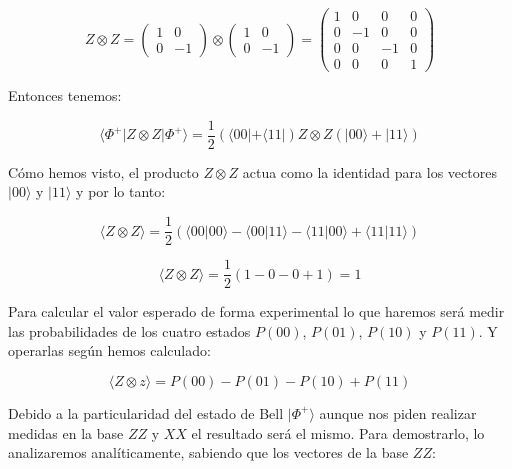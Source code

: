 \documentclass[11pt, a4paper, twocolumn]{article}
\begin{document}
\begin{equation}
	Z \otimes Z = 
	\begin{pmatrix}
		1 & 0\\ 0 & -1
	\end{pmatrix} \otimes
	\begin{pmatrix}
		1 & 0\\ 0 & -1
	\end{pmatrix}
	=
	\begin{pmatrix}
		1 & 0 & 0 & 0 \\
		0 &-1 & 0 & 0 \\
		0 & 0 &-1 & 0 \\
		0 & 0 & 0 & 1

	\end{pmatrix}	
\end{equation}

Entonces tenemos:

\begin{equation}
	\langle \Phi^+| Z \otimes Z |\Phi^+ \rangle = 
	\frac{1}{2}(\langle 00 | + \langle 11|) Z \otimes Z (|00\rangle + |11\rangle)
\end{equation}

Cómo hemos visto, el producto $Z \otimes Z$ actua como la identidad para los 
vectores $|00\rangle$ y $|11\rangle$ y por lo tanto:

\begin{equation}
	\langle Z \otimes Z \rangle = \frac{1}{2}(\langle 00 | 00 \rangle - 
	\langle 00 | 11 \rangle - \langle 11 | 00 \rangle + \langle 11 | 11 \rangle)
\end{equation}

\begin{equation}
	\langle Z \otimes Z \rangle = \frac{1}{2}(1 - 0 -0 +1) = 1
\end{equation}

Para calcular el valor esperado de forma experimental lo que haremos será medir
las probabilidades de los cuatro estados $P(00)$, $P(01)$, $P(10)$ y $P(11)$. Y 
operarlas según hemos calculado:

\begin{equation}
	\langle Z \otimes z \rangle = P(00) - P(01) - P(10) + P(11)
\end{equation}

\vspace{0.2cm}

Debido a la particularidad del estado de Bell $|\Phi^+\rangle$ aunque nos
piden realizar medidas en la base $ZZ$ y $XX$ el resultado será el mismo.
Para demostrarlo, lo analizaremos analíticamente, sabiendo que los vectores
de la base $ZZ$:
\end{document}

